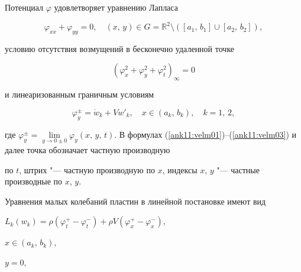 Потенциал $\varphi$ удовлетворяет уравнению Лапласа

\begin{equation}

\label{ank11:velm01}

\varphi_{xx} + \varphi _{yy} = 0,\quad (x,\,y)\in G=\mathbb R^2\setminus \left([a_1,\,b_1]\cup[a_2,\,b_2]\right),

\end{equation}

условию отсутствия возмущений в бесконечно удаленной точке

\begin{equation}

\label{ank11:velm02}

\left(\varphi _x^2 + \varphi _y^2 + \varphi _t^2 \right)_\infty = 0

\end{equation}

и линеаризованным граничным условиям

\begin{equation}

\label{ank11:velm03}

\varphi_y^\pm  = \dot {w}_k + V w'_k,\quad x \in (a_k,\,b_k), \quad k=1,\,2,

\end{equation}

где $\varphi _y^\pm  = \lim\limits_{y \to 0 \pm 0} \varphi

_y (x,\,y,\,t)$. В формулах (\ref{ank11:velm01})--(\ref{ank11:velm03}) и далее точка обозначает частную производную

по $t$, штрих "--- частную производную по $x$, индексы $x$, $y$ "--- частные производные по $x$, $y$.



Уравнения малых колебаний пластин в линейной постановке имеют вид



$L_k (w_k) = \rho \left(\varphi_t^+  - \varphi_t^- \right) + \rho

V \left(\varphi_x^+  - \varphi_x^-\right)$,


$x \in (a_k,\,b_k),$


$ y = 0,$


